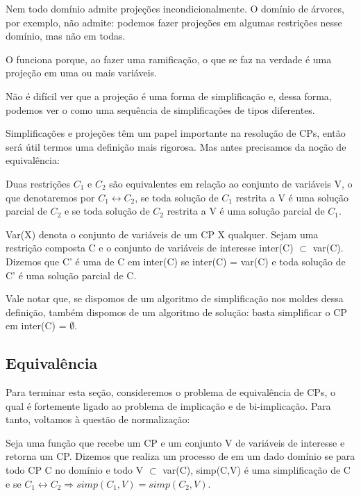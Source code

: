 Nem todo domínio admite projeções incondicionalmente. O domínio de
árvores, por exemplo, não admite: podemos fazer projeções em algumas
restrições nesse domínio, mas não em todas.

O  funciona porque, ao fazer uma
ramificação, o que se faz na verdade é uma projeção em uma ou mais
variáveis.

Não é difícil ver que a projeção é uma forma de simplificação e, dessa
forma, podemos ver o  como uma sequência
de simplificações de tipos diferentes.

Simplificações e projeções têm um papel importante na resolução de
CPs, então será útil termos uma definição mais rigorosa. Mas antes
precisamos da noção de equivalência:

\begin{definition}
  Duas restrições  $C_1$ e $C_2$
  são equivalentes em relação ao conjunto de variáveis V, o que
  denotaremos por $C_1 \leftrightarrow C_2$, se toda solução de $C_1$
  restrita a V é uma solução parcial de $C_2$ e se toda solução de
  $C_2$ restrita a V é uma solução parcial de $C_1$.
\end{definition}

\begin{definition}
  Var(X) denota o conjunto de variáveis de um CP X qualquer. Sejam uma
  restrição composta C e o conjunto de variáveis de interesse inter(C)
  $\subset$ var(C). Dizemos que C' é uma  de
  C em inter(C) se inter(C) = var(C) e toda solução de C' é uma
  solução parcial de C.
\end{definition}

Vale notar que, se dispomos de um algoritmo de simplificação nos
moldes dessa definição, também dispomos de um algoritmo de solução:
basta simplificar o CP em inter(C) = $\emptyset$.

\subsection{Equivalência}

Para terminar esta seção, consideremos o problema de equivalência de
CPs, o qual é fortemente ligado ao problema de implicação e de
bi-implicação. Para tanto, voltamos à questão de normalização:

\begin{definition}
  Seja  uma função que recebe um CP e um conjunto V
  de variáveis de interesse e retorna um CP. Dizemos que
   realiza um processo de  em um dado domínio se para todo CP C no domínio e todo
  V $\subset$ var(C), simp(C,V) é uma simplificação de C e se $C_1
  \leftrightarrow C_2 \Rightarrow simp(C_1,V) = simp(C_2,V)$.
\end{definition}

